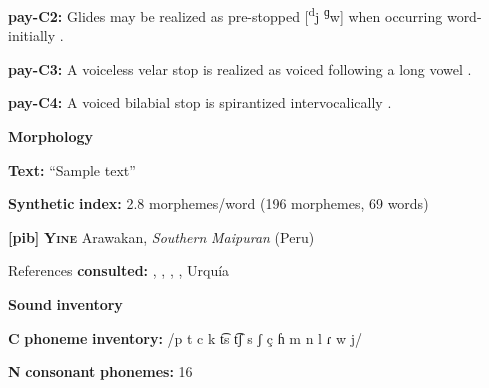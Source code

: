 \documentclass[output=paper]{langsci/langscibook}
\begin{document}
\begin{styleBody}
\textbf{pay-C2:} Glides may be realized as pre-stopped [\textsuperscript{d}j \textsuperscript{ɡ}w] when occurring word-initially \citep[16]{Holt1999}.
\end{styleBody}

\begin{styleBody}
\textbf{pay-C3:} A voiceless velar stop is realized as voiced following a long vowel \citep[15-16]{Holt1999}.
\end{styleBody}

\begin{styleBody}
\textbf{pay-C4:} A voiced bilabial stop is spirantized intervocalically \citep[16]{Holt1999}.
\end{styleBody}

\begin{styleBody}
\textbf{Morphology}
\end{styleBody}

\begin{styleBody}
\textbf{Text:} “Sample text” \citep[79-80]{Holt1999}
\end{styleBody}

\begin{styleBody}
\textbf{Synthetic} \textbf{index:} 2.8 morphemes/word (196 morphemes, 69 words)
\end{styleBody}

\begin{styleBody}
\textbf{[pib]}   \textbf{\textsc{Yine}}  Arawakan, \textit{Southern} \textit{Maipuran} (Peru)
\end{styleBody}

\begin{styleBody}
References \textbf{consulted:} \citet{Hanson2010}, \citet{Lin1997}, \citet{Matteson1965}, \citet{Parker1989}, Urquía \citet{SebastiánMarlett2008}
\end{styleBody}

\begin{styleBody}
\textbf{Sound} \textbf{inventory}
\end{styleBody}

\begin{styleBody}
\textbf{C} \textbf{phoneme} \textbf{inventory:} /p t c k t͡s t͡ʃ s ʃ ç ɦ m n l ɾ w j/
\end{styleBody}

\begin{styleBody}
\textbf{N} \textbf{consonant} \textbf{phonemes:} 16
\end{styleBody}
\end{document}
